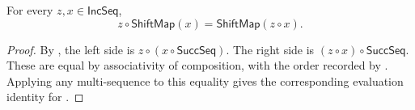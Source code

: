 \begin{lemma}
For every $z,x\in\mathsf{IncSeq}$,
\[
z\circ\mathsf{ShiftMap}(x)
=\mathsf{ShiftMap}(z\circ x).
\]
\end{lemma}
\begin{proof}
By , the left side is
$z\circ(x\circ\mathsf{SuccSeq})$.  The right side is
$(z\circ x)\circ\mathsf{SuccSeq}$.  These are equal by associativity of
composition, with the order recorded by .  Applying
any multi-sequence to this equality gives the corresponding evaluation
identity for .
\end{proof}
